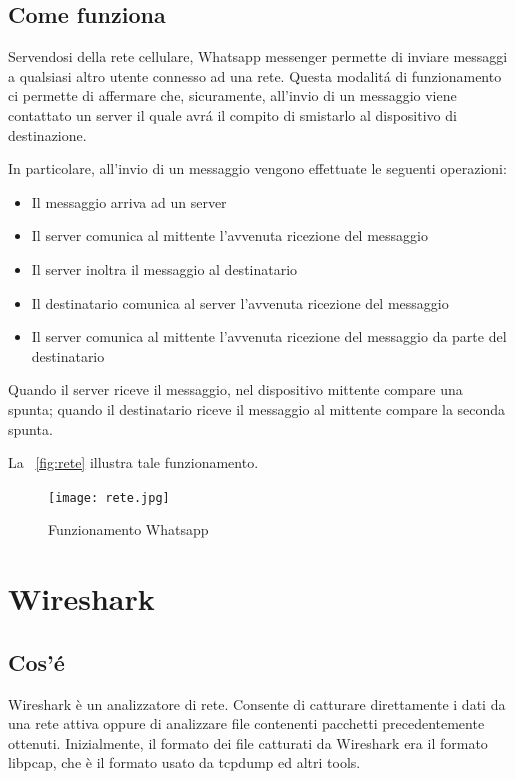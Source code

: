 \documentclass[a4paper,11pt]{book}
\begin{document}
\clearpage

\subsection{Come funziona}
Servendosi della rete cellulare, Whatsapp messenger permette di inviare messaggi a qualsiasi altro utente connesso ad una rete. Questa modalit\'a di funzionamento ci permette di affermare che, sicuramente, all'invio di un messaggio viene contattato un server il quale avr\'a il compito di smistarlo al dispositivo di destinazione.

In particolare, all'invio di un messaggio vengono effettuate le seguenti operazioni:
\begin{itemize}
 \item Il messaggio arriva ad un server
 \item Il server comunica al mittente l'avvenuta ricezione del messaggio
 \item Il server inoltra il messaggio al destinatario
 \item Il destinatario comunica al server l'avvenuta ricezione del messaggio
 \item Il server comunica al mittente l'avvenuta ricezione del messaggio da parte del destinatario
\end{itemize}

Quando il server riceve il messaggio, nel dispositivo mittente compare una spunta; quando il destinatario riceve il messaggio al mittente compare la seconda spunta.

La \figurename~\ref{fig:rete} illustra tale funzionamento.
~
\begin{figure}[h!t]
\centering
\texttt{[image: rete.jpg]}
\caption{Funzionamento Whatsapp}
\end{figure}

\clearpage

\section{Wireshark}
\subsection{Cos'\'e}
Wireshark è un analizzatore di rete. Consente di catturare direttamente i dati da una rete attiva oppure di analizzare file contenenti pacchetti precedentemente ottenuti. Inizialmente, il formato dei file catturati da Wireshark era il formato libpcap, che è il formato usato da tcpdump ed altri tools.
\end{document}
